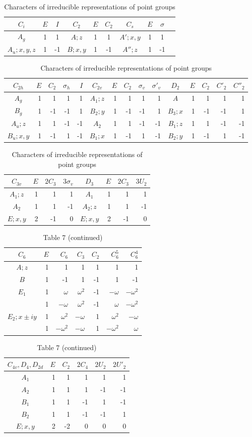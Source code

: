\begin{table}[p]
\centering\small
\caption{Characters of irreducible representations of point groups}
\begin{tabular}{c|cc|c|cc|c|ccc}
$C_i$&$E$&$I$&$C_2$&$E$&$C_2$&$C_s$&$E$&$\sigma$\\\hline
$A_g$&1&1&$A;z$&1&1&$A';x,y$&1&1\\
$A_u;x,y,z$&1&-1&$B;x,y$&1&-1&$A'';z$&1&-1
\end{tabular}

\medskip
\begin{tabular}{c|rrrr|c|rrrr|c|rrrr}
$C_{2h}$&$E$&$C_2$&$\sigma_h$&$I$&$C_{2v}$&$E$&$C_2$&$\sigma_v$&$\sigma'_v$&$D_2$&$E$&$C_2$&$C'_2$&$C''_2$\\\hline
$A_g$&1&1&1&1&$A_1;z$&1&1&1&1&$A$&1&1&1&1\\
$B_g$&1&-1&-1&1&$B_2;y$&1&-1&-1&1&$B_3;x$&1&-1&-1&1\\
$A_u;z$&1&1&-1&-1&$A_2$&1&1&-1&-1&$B_1;z$&1&1&-1&-1\\
$B_u;x,y$&1&-1&1&-1&$B_1;x$&1&-1&1&-1&$B_2;y$&1&-1&1&-1
\end{tabular}

\medskip
\begin{tabular}{c|rrr|c|rrr}
$C_{3v}$&$E$&$2C_3$&$3\sigma_v$&$D_3$&$E$&$2C_3$&$3U_2$\\\hline
$A_1;z$&1&1&1&$A_1$&1&1&1\\
$A_2$&1&1&-1&$A_2;z$&1&1&-1\\
$E;x,y$&2&-1&0&$E;x,y$&2&-1&0
\end{tabular}
\end{table}

\begin{table}[p]\centering\small
\caption*{Table 7 (continued)}
\begin{tabular}{c|rrrrrr}
$C_6$&$E$&$C_6$&$C_3$&$C_2$&$C_6^5$&$C_6^4$\\\hline
$A;z$&1&1&1&1&1&1\\ $B$&1&-1&1&-1&1&-1\\
$E_1$&1&$\omega$&$\omega^2$&-1&$-\omega$&$-\omega^2$\\
&1&$-\omega$&$\omega^2$&-1&$\omega$&$-\omega^2$\\
$E_2;x\pm iy$&1&$\omega^2$&$-\omega$&1&$\omega^2$&$-\omega$\\
&1&$-\omega^2$&$-\omega$&1&$-\omega^2$&$\omega$
\end{tabular}

\medskip
\begin{tabular}{c|rrrrr}
$C_{4v},D_4,D_{2d}$&$E$&$C_2$&$2C_4$&$2U_2$&$2U'_2$\\\hline
$A_1$&1&1&1&1&1\\ $A_2$&1&1&1&-1&-1\\
$B_1$&1&1&-1&1&-1\\ $B_2$&1&1&-1&-1&1\\ $E;x,y$&2&-2&0&0&0
\end{tabular}
\end{table}

